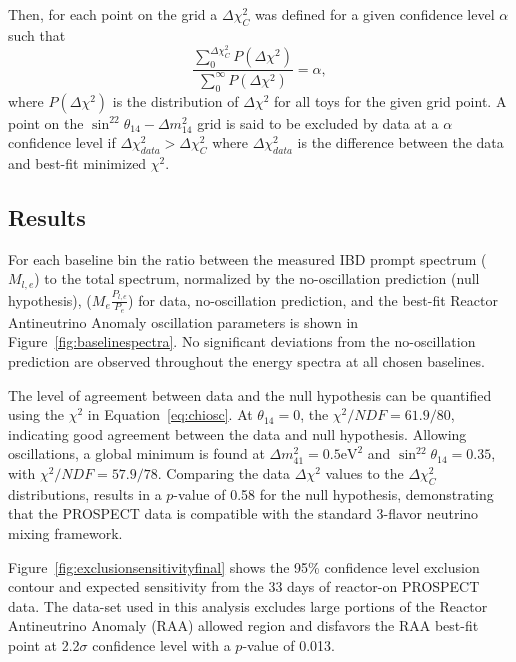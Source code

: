 Then, for each point on the grid a $\Delta\chi^2_C$ was defined for a given confidence level $\alpha$ such that
\begin{equation}
	\frac{\sum_{0}^{\Delta\chi^2_C}P(\Delta\chi^2)}{\sum_{0}^{\infty}P(\Delta\chi^2)} = \alpha,
\end{equation}
where $P(\Delta\chi^2)$ is the distribution of $\Delta\chi^2$ for all toys for the given grid point.
A point on the $\sin^22\theta_{14}-\Delta m^2_{14}$ grid is said to be excluded by data at a $\alpha$ confidence level if $\Delta\chi^2_{data} > \Delta\chi^2_{C}$ where $\Delta\chi^2_{data}$ is the difference between the data and best-fit minimized $\chi^2$.


\subsection{Results}

For each baseline bin the ratio between the measured IBD prompt spectrum ($M_{l,e}$) to the total spectrum, normalized by the no-oscillation prediction (null hypothesis), ($M_e\frac{P_{l,e}}{P_e}$) for data, no-oscillation prediction, and the best-fit Reactor Antineutrino Anomaly oscillation parameters is shown in Figure~\ref{fig:baselinespectra}.
No significant deviations from the no-oscillation prediction are observed throughout the energy spectra at all chosen baselines.

The level of agreement between data and the null hypothesis can be quantified using the $\chi^2$ in Equation~\ref{eq:chiosc}.
At $\theta_{14} = 0$, the $\chi^2/NDF = 61.9/80$, indicating good agreement between the data and null hypothesis.
Allowing oscillations, a global minimum is found at $\Delta m^2_{41} = 0.5 \textrm{eV}^2$ and $\sin^22\theta_{14} = 0.35$, with $\chi^2/NDF = 57.9/78$.
Comparing the data $\Delta\chi^2$ values to the $\Delta\chi^2_C$ distributions, results in a $p$-value of 0.58 for the null hypothesis, demonstrating that the PROSPECT data is compatible with the standard 3-flavor neutrino mixing framework.

Figure~\ref{fig:exclusionsensitivityfinal} shows the 95\% confidence level exclusion contour and expected sensitivity from the 33 days of reactor-on PROSPECT data.
The data-set used in this analysis excludes large portions of the Reactor Antineutrino Anomaly (RAA) allowed region and disfavors the RAA best-fit point at 2.2$\sigma$ confidence level with a $p$-value of 0.013.


